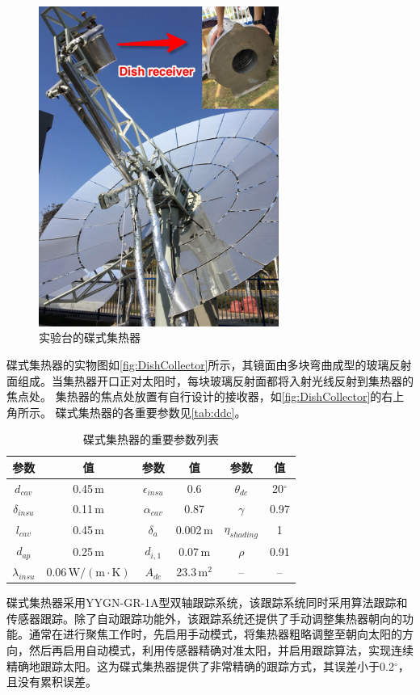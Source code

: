 \begin{figure}[!ht]
\centering
\includegraphics[width=0.7\textwidth]{fig/DishCollector.jpg}
\caption{实验台的碟式集热器}
\label{fig:DishCollector}
\end{figure}
碟式集热器的实物图如\autoref{fig:DishCollector}所示，其镜面由多块弯曲成型的玻璃反射面组成。当集热器开口正对太阳时，每块玻璃反射面都将入射光线反射到集热器的焦点处。
集热器的焦点处放置有自行设计的接收器，如\autoref{fig:DishCollector}的右上角所示。
碟式集热器的各重要参数见\autoref{tab:ddc}。
\begin{table}[htbp]
	\caption{碟式集热器的重要参数列表}
	\centering
	\begin{tabular}{cccccc}
		\toprule
		参数		&	值	&	参数		&	值	&	参数		&	值\\
		\midrule
		$d_{cav}$	&	0.45$\,\mathrm{m}$	&	$\epsilon_{insu}$	&	0.6	&	$\theta_{dc}$	&	20$^\circ$\\
		$\delta_{insu}$	&	0.11$\,\mathrm{m}$	&	$\alpha_{cav}$	&	0.87	&	$\gamma$	&	0.97\\
		$l_{cav}$	&	0.45$\,\mathrm{m}$	&	$\delta_a$		&	0.002$\,\mathrm{m}$	&	$\eta_{shading}$	&	1\\
		$d_{ap}$	&	0.25$\,\mathrm{m}$	&	$d_{i,1}$	&	0.07$\,\mathrm{m}$	&	$\rho$	&	0.91\\
		$\lambda_{insu}$	&	0.06$\,\mathrm{W/(m\cdot K)}$	&	$A_{dc}$	&	23.3$\,\mathrm{m^2}$	& -- & --	\\		
		\bottomrule
	\end{tabular}
	\label{tab:ddc}
\end{table}
碟式集热器采用YYGN-GR-1A型双轴跟踪系统，该跟踪系统同时采用算法跟踪和传感器跟踪。除了自动跟踪功能外，该跟踪系统还提供了手动调整集热器朝向的功能。通常在进行聚焦工作时，先启用手动模式，将集热器粗略调整至朝向太阳的方向，然后再启用自动模式，利用传感器精确对准太阳，并启用跟踪算法，实现连续精确地跟踪太阳。这为碟式集热器提供了非常精确的跟踪方式，其误差小于0.2$^\circ$，且没有累积误差。


